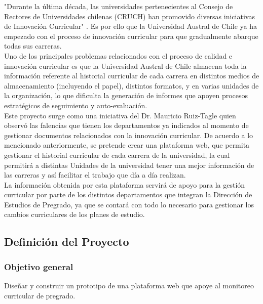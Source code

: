 	"Durante la última década, las universidades pertenecientes al Consejo de Rectores de Universidades chilenas (CRUCH) 
	han promovido diversas iniciativas de Innovación Curricular" \cite{INN11}. Es por ello que la Universidad Austral de 
	Chile ya ha empezado con el proceso de innovación curricular para que gradualmente abarque todas sus carreras.
	\\
	
	Uno de los principales problemas relacionados con el proceso de calidad e innovación curricular es que la Universidad 
	Austral de Chile almacena toda la información referente al historial curricular de cada carrera en distintos medios 
	de almacenamiento (incluyendo el papel), distintos  formatos, y en varias unidades de la organización, lo que 
	dificulta la generación de informes que apoyen procesos estratégicos de seguimiento y auto-evaluación.
	\\
	
	Este proyecto surge como una iniciativa del Dr. Mauricio Ruiz-Tagle quien observó las falencias que tienen los 
	departamentos ya indicados al momento de gestionar documentos relacionados con la innovación curricular.  
	De acuerdo a lo mencionado anteriormente, se pretende crear una plataforma web, que permita gestionar el historial 
	curricular de cada carrera de la universidad, la cual permitirá a distintas Unidades de la universidad tener una 
	mejor información  de las carreras y así facilitar el trabajo que día a día realizan.
	\\
	
	La información obtenida por esta plataforma servirá de apoyo para la gestión curricular por parte de los distintos departamentos que integran la Dirección de Estudios de Pregrado, ya que se contará con todo lo necesario para gestionar los cambios curriculares de los planes de estudio.

	\subsection{Definición del Proyecto}
	
	\subsubsection{Objetivo general}
	
	Diseñar y construir  un prototipo de una plataforma web que apoye al monitoreo curricular de pregrado. \\
	\vspace{-0.4cm}
	
